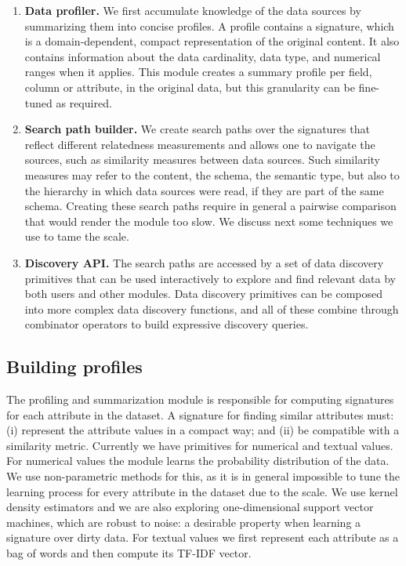 \begin{enumerate}
\item {\bf Data profiler.} We first accumulate knowledge of the data sources by
summarizing them into concise profiles. A profile contains a signature, which is
a domain-dependent, compact representation of the original content. It also
contains information about the data cardinality, data type, and numerical ranges
when it applies. This module creates a summary profile per field, \ie column or
attribute, in the original data, but this granularity can be fine-tuned as
required.
\item {\bf Search path builder.} We create search paths over the signatures that
reflect different relatedness measurements and allows one to navigate the
sources, such as similarity measures between data sources. Such similarity
measures may refer to the content, the schema, the semantic type, but also to
the hierarchy in which data sources were read, \ie if they are part of the same
schema. Creating these search paths require in general a pairwise comparison
that would render the module too slow.  We discuss next some techniques we use
to tame the scale.  
\item {\bf Discovery API.} The search paths are accessed by a set of data
discovery primitives that can be used interactively to explore and find relevant
data by both users and other modules. Data discovery primitives can be composed
into more complex data discovery functions, and all of these combine through
combinator operators to build expressive discovery queries.  
\end{enumerate}


\subsection{Building profiles}

The profiling and summarization module is responsible
for computing signatures for each attribute in the dataset. A signature for
finding similar attributes must: (i) represent the attribute values in a compact
way; and (ii) be compatible with a similarity metric. Currently we have
primitives for numerical and textual values. For numerical values the module
learns the probability distribution of the data. We use non-parametric methods
for this, as it is in general impossible to tune the learning process for every
attribute in the dataset due to the scale. We use kernel density estimators and
we are also exploring one-dimensional support vector machines, which are robust
to noise: a desirable property when learning a signature over dirty data. For
textual values we first represent each attribute as a bag of words and then
compute its TF-IDF vector.


